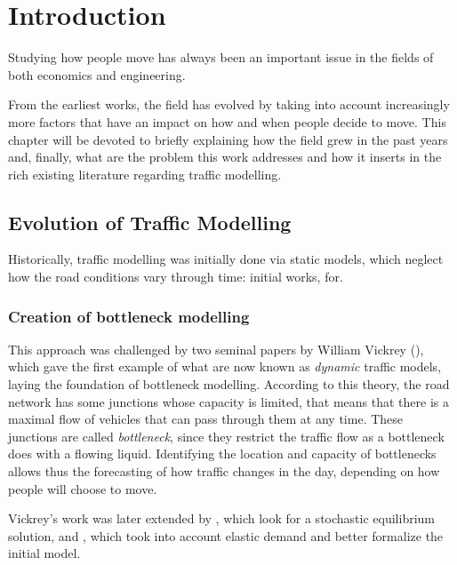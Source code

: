 
\chapter{Introduction}

Studying how people move has always been an important issue in the fields of both economics  and  engineering.

From the earliest works, the field has evolved by taking into account increasingly more factors that have an impact on how and when people decide to move.
This chapter will be devoted to briefly explaining how the field grew in the past years and,
finally, what are the problem this work addresses and how it inserts in the rich existing literature regarding traffic modelling.

\section{Evolution of Traffic Modelling}
\label{sec:hist}

Historically, traffic modelling was initially done via static models,
which neglect how the road conditions vary through time:
initial works, for.

\subsection{Creation of bottleneck modelling}

This approach was challenged by two seminal papers by William Vickrey (\cite{f32d6720-dd02-34b7-a4ba-c4c21193efe7, 4ffb5da1-1f49-3898-98a7-209781744dc0}),
which gave the first example of what are now known as \textit{dynamic} traffic models,
laying the foundation of bottleneck modelling.
According to this theory, the road network has some junctions whose capacity is limited,
that means that there is a maximal flow of vehicles that can pass through them at any time.
These junctions are called \textit{bottleneck}, since they restrict the traffic flow as a bottleneck does with a flowing liquid.
Identifying the location and capacity of bottlenecks allows thus the forecasting of how traffic changes in the day,
depending on how people will choose to move.

Vickrey's work was later extended by \textcite{de1983stochastic}, which look for a stochastic equilibrium solution, and \textcite{d0907f84-e14a-3d98-ad20-759f41491d6e}, which took into account elastic demand and better formalize the initial model.

